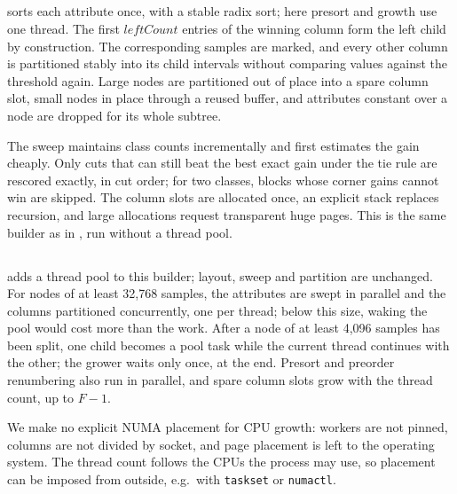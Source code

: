 \subsection{\ImplSerialOpt}
\label{sec:impl-serial}

\ImplSerialOpt{} sorts each attribute once, with a stable radix sort; here presort and growth use one thread. The first $leftCount$ entries of the winning column form the left child by construction. The corresponding samples are marked, and every other column is partitioned stably into its child intervals without comparing values against the threshold again. Large nodes are partitioned out of place into a spare column slot, small nodes in place through a reused buffer, and attributes constant over a node are dropped for its whole subtree.

The sweep maintains class counts incrementally and first estimates the gain cheaply. Only cuts that can still beat the best exact gain under the tie rule are rescored exactly, in cut order; for two classes, blocks whose corner gains cannot win are skipped. The column slots are allocated once, an explicit stack replaces recursion, and large allocations request transparent huge pages. This is the same builder as in \ImplParallel{}, run without a thread pool.

\subsection{\ImplParallel}
\label{sec:impl-parallel}

\ImplParallel{} adds a thread pool to this builder; layout, sweep and partition are unchanged. For nodes of at least 32{,}768 samples, the attributes are swept in parallel and the columns partitioned concurrently, one per thread; below this size, waking the pool would cost more than the work. After a node of at least 4{,}096 samples has been split, one child becomes a pool task while the current thread continues with the other; the grower waits only once, at the end. Presort and preorder renumbering also run in parallel, and spare column slots grow with the thread count, up to $F-1$.

We make no explicit NUMA placement for CPU growth: workers are not pinned, columns are not divided by socket, and page placement is left to the operating system. The thread count follows the CPUs the process may use, so placement can be imposed from outside, e.g.\ with \texttt{taskset} or \texttt{numactl}.

\subsection{\ImplGpu}
\label{sec:impl-gpu}

